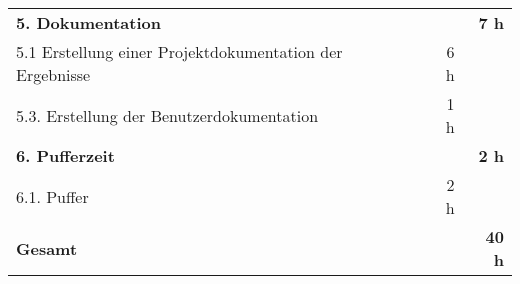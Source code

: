 \begin{tabularx}{\textwidth}{Xrrr}
\rowcolor{heading}\textbf{5. Dokumentation} & \textbf{} & \textbf{} & \textbf{7 h} \\
5.1 Erstellung einer Projektdokumentation der Ergebnisse &       &   6 h   &  \\
\rowcolor{odd}5.3. Erstellung der Benutzerdokumentation &       &    1 h   &    \\
\rowcolor{heading}\textbf{6. Pufferzeit} & \textbf{} & \textbf{} & \textbf{2 h} \\
6.1. Puffer &       & 2 h   &  \\
\hline
\hline
\rowcolor{heading}\textbf{Gesamt} & \textbf{} & \textbf{} & \textbf{40 h} \\
\end{tabularx}
